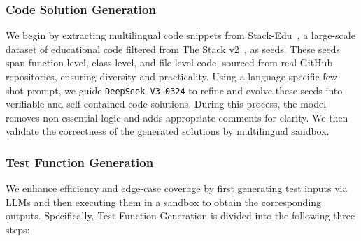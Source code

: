 










\subsubsection{Code Solution Generation}

We begin by extracting multilingual code snippets from Stack-Edu~\citep{allal2025smollm2smolgoesbig}, a large-scale dataset of educational code filtered from The Stack v2~\citep{lozhkov2024starcoder}, as seeds. These seeds span function-level, class-level, and file-level code, sourced from real GitHub repositories, ensuring diversity and practicality. Using a language-specific few-shot prompt, we guide \texttt{DeepSeek-V3-0324} to refine and evolve these seeds into verifiable and self-contained code solutions. During this process, the model removes non-essential logic and adds appropriate comments for clarity. We then validate the correctness of the generated solutions by multilingual sandbox.

\subsubsection{Test Function Generation}



We enhance efficiency and edge-case coverage by first generating test inputs via LLMs and then executing them in a sandbox to obtain the corresponding outputs. Specifically, Test Function Generation is divided into the following three steps:

